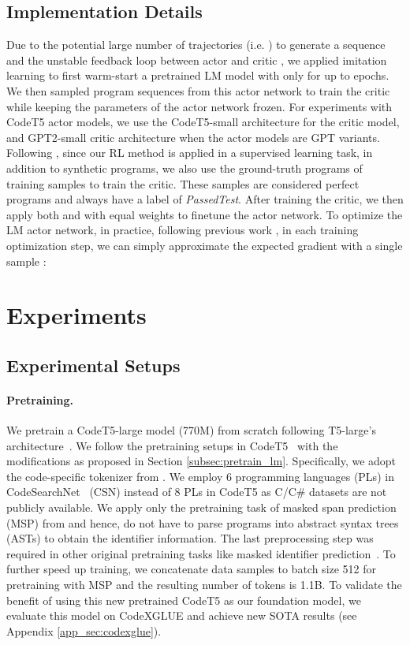 \documentclass{article}
\begin{document}
\subsection{Implementation Details}
Due to the potential large number of trajectories (i.e. ) to generate a sequence and the  unstable feedback loop between actor and critic \citep{lillicrap2015continuous, wang2018video}, we applied imitation learning to first warm-start a pretrained LM model with  only for up to  epochs. 
We then sampled program sequences from this actor network to train the critic while keeping the parameters of the actor network frozen. For experiments with CodeT5 actor models, we use the CodeT5-small architecture for the critic model, and GPT2-small critic architecture when the actor models are GPT variants. 
Following \citep{bahdanau2016actor}, since our RL method is applied in a supervised learning task, in addition to synthetic programs, we also use the ground-truth programs of training samples to train the critic.
These samples are considered perfect programs and always have a label of \emph{PassedTest}. 
After training the critic, we then apply both  and  with equal weights to finetune the actor network. To optimize the LM actor network, in practice, following previous work \citep{bahdanau2016actor, rennie2017self, wang2018video}, 
in each training optimization step, we can simply approximate the expected gradient with a single sample :


 
\section{Experiments}
\label{sec:experiments}
\subsection{Experimental Setups}

\paragraph{Pretraining.} 
We pretrain a CodeT5-large model (770M) from scratch following T5-large's architecture~\citep{t5}. We follow the pretraining setups in CodeT5~\citep{codet5} with the modifications as proposed in Section \ref{subsec:pretrain_lm}.
Specifically, we adopt the code-specific tokenizer from \citet{codet5}.
We employ 6 programming languages (PLs) in CodeSearchNet~\citep{csn} (CSN) instead of 8 PLs in CodeT5 as C/C\# datasets are not publicly available. 
We apply only the pretraining task of masked span prediction (MSP) from \citep{codet5} and hence, do not have to parse programs into abstract syntax trees (ASTs) to obtain the identifier information.
The last preprocessing step was required in other original pretraining tasks like masked identifier prediction~\citep{codet5}.
To further speed up training, we concatenate data samples to batch size 512 for pretraining with MSP and the resulting number of tokens is 1.1B.
To validate the benefit of using this new pretrained CodeT5 as our foundation model, we evaluate this model on CodeXGLUE \citep{codexglue} and achieve new SOTA results (see Appendix \ref{app_sec:codexglue}). 
\end{document}

